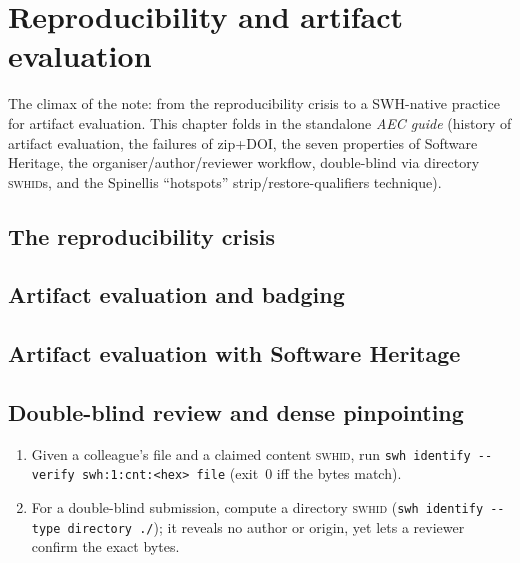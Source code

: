 \chapter{Reproducibility and artifact evaluation}
\label{ch:repro}

The climax of the note: from the reproducibility crisis to a SWH-native practice for
artifact evaluation. This chapter folds in the standalone \emph{AEC guide} (history of
artifact evaluation, the failures of zip+DOI, the seven properties of Software Heritage, the
organiser/author/reviewer workflow, double-blind via directory \textsc{swhid}s, and the
Spinellis ``hotspots'' strip/restore-qualifiers technique).


\section{The reproducibility crisis}

\section{Artifact evaluation and badging}

\section{Artifact evaluation with Software Heritage}

\section{Double-blind review and dense pinpointing}

\begin{handson}
\begin{enumerate}[nosep,leftmargin=*]
  \item Given a colleague's file and a claimed content \textsc{swhid}, run
        \texttt{swh identify -{}-verify swh:1:cnt:<hex> file} (exit~0 iff the bytes match).
  \item For a double-blind submission, compute a directory \textsc{swhid}
        (\texttt{swh identify -{}-type directory ./}); it reveals no author or origin, yet
        lets a reviewer confirm the exact bytes.
\end{enumerate}
\end{handson}
